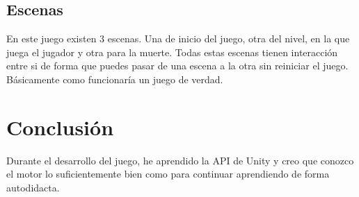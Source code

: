 \documentclass[titlepage, 4apaper]{article}
\begin{document}
\subsection{Escenas}
En este juego existen 3 escenas. Una de inicio del juego, otra del nivel, en la que juega el jugador y otra para la muerte. Todas estas escenas tienen interacción entre si de forma que puedes pasar de una escena a la otra sin reiniciar el juego. Básicamente como funcionaría un juego de verdad.
\section{Conclusión}
Durante el desarrollo del juego, he aprendido la API de Unity y creo que conozco el motor lo suficientemente bien como para continuar aprendiendo de forma autodidacta.
\end{document}
